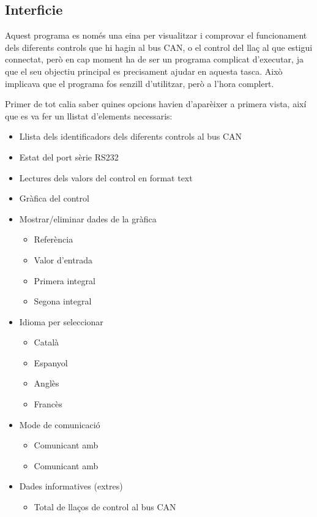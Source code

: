 \subsection{Interficie}\label{cap:dis:visual}

Aquest programa es només una eina per visualitzar i comprovar el funcionament dels diferents controls que hi hagin al bus CAN, o el control del llaç al que estigui connectat, però en cap moment ha de ser un programa complicat d'executar, ja que el seu objectiu principal es precisament ajudar en aquesta tasca. Això implicava que el programa fos senzill d'utilitzar, però a l'hora complert.

Primer de tot calia saber quines opcions havien d'aparèixer a primera vista, així que es va fer un llistat d'elements necessaris:

\begin{itemize}
	\item Llista dels identificadors dels diferents controls al bus CAN
	\item Estat del port sèrie RS232
	\item Lectures dels valors del control en format text
	\item Gràfica del control
	\item Mostrar/eliminar dades de la gràfica
		\begin{itemize}
			\item Referència
			\item Valor d'entrada
			\item Primera integral
			\item Segona integral
		\end{itemize}
	\item Idioma per seleccionar
		\begin{itemize}
			\item Català
			\item Espanyol
			\item Anglès
			\item Francès
		\end{itemize}
	\item Mode de comunicació
		\begin{itemize}
			\item Comunicant amb \SensorActuador
			\item Comunicant amb \Monitor
		\end{itemize}
	\item Dades informatives (extres)
		\begin{itemize}
			\item Total de llaços de control al bus CAN

\end{itemize}
\end{itemize}
